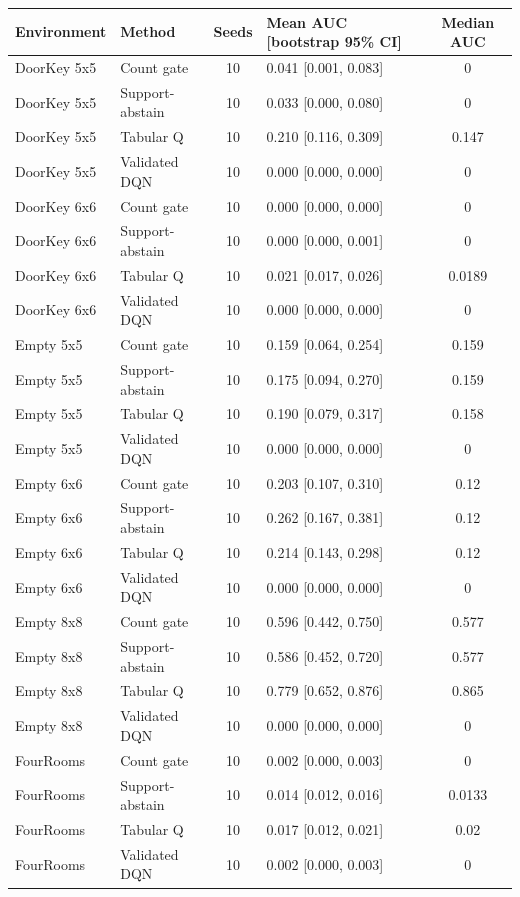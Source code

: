 \begin{tabular}{llclc}
\toprule
Environment & Method & Seeds & Mean AUC [bootstrap 95\% CI] & Median AUC \\
\midrule
DoorKey 5x5 & Count gate & 10 & 0.041 [0.001, 0.083] & 0 \\
DoorKey 5x5 & Support-abstain & 10 & 0.033 [0.000, 0.080] & 0 \\
DoorKey 5x5 & Tabular Q & 10 & 0.210 [0.116, 0.309] & 0.147 \\
DoorKey 5x5 & Validated DQN & 10 & 0.000 [0.000, 0.000] & 0 \\
DoorKey 6x6 & Count gate & 10 & 0.000 [0.000, 0.000] & 0 \\
DoorKey 6x6 & Support-abstain & 10 & 0.000 [0.000, 0.001] & 0 \\
DoorKey 6x6 & Tabular Q & 10 & 0.021 [0.017, 0.026] & 0.0189 \\
DoorKey 6x6 & Validated DQN & 10 & 0.000 [0.000, 0.000] & 0 \\
Empty 5x5 & Count gate & 10 & 0.159 [0.064, 0.254] & 0.159 \\
Empty 5x5 & Support-abstain & 10 & 0.175 [0.094, 0.270] & 0.159 \\
Empty 5x5 & Tabular Q & 10 & 0.190 [0.079, 0.317] & 0.158 \\
Empty 5x5 & Validated DQN & 10 & 0.000 [0.000, 0.000] & 0 \\
Empty 6x6 & Count gate & 10 & 0.203 [0.107, 0.310] & 0.12 \\
Empty 6x6 & Support-abstain & 10 & 0.262 [0.167, 0.381] & 0.12 \\
Empty 6x6 & Tabular Q & 10 & 0.214 [0.143, 0.298] & 0.12 \\
Empty 6x6 & Validated DQN & 10 & 0.000 [0.000, 0.000] & 0 \\
Empty 8x8 & Count gate & 10 & 0.596 [0.442, 0.750] & 0.577 \\
Empty 8x8 & Support-abstain & 10 & 0.586 [0.452, 0.720] & 0.577 \\
Empty 8x8 & Tabular Q & 10 & 0.779 [0.652, 0.876] & 0.865 \\
Empty 8x8 & Validated DQN & 10 & 0.000 [0.000, 0.000] & 0 \\
FourRooms & Count gate & 10 & 0.002 [0.000, 0.003] & 0 \\
FourRooms & Support-abstain & 10 & 0.014 [0.012, 0.016] & 0.0133 \\
FourRooms & Tabular Q & 10 & 0.017 [0.012, 0.021] & 0.02 \\
FourRooms & Validated DQN & 10 & 0.002 [0.000, 0.003] & 0 \\
\bottomrule
\end{tabular}
